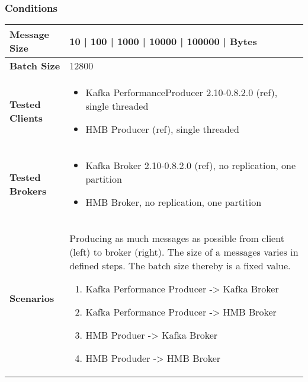 \subsubsection{Conditions}
\begin{table}[H]
\begin{tabular}{|l| p{12cm}|} \hline
{\bf Message Size}   & 10 | 100 | 1000 | 10000 | 100000 | Bytes \\ \hline
{\bf Batch Size}     & 12800 \\ \hline
{\bf Tested Clients} &
    \begin{itemize}
        \item Kafka PerformanceProducer 2.10-0.8.2.0 (ref), single threaded
        \item HMB Producer (ref), single threaded
    \end{itemize}\\ \hline
{\bf Tested Brokers} &
    \begin{itemize}
        \item Kafka Broker 2.10-0.8.2.0 (ref), no replication, one partition
        \item HMB Broker, no replication, one partition
    \end{itemize}\\ \hline
{\bf Scenarios} & Producing as much messages as possible from client (left) to broker (right).
    The size of a messages varies in defined steps. The batch size thereby is a fixed value. 
  \begin{enumerate}
        \item Kafka Performance Producer -> Kafka Broker
        \item Kafka Performance Producer -> HMB Broker
        \item HMB Produer -> Kafka Broker
        \item HMB Produder -> HMB Broker
    \end{enumerate} \\ \hline
\end{tabular}
\end{table}

